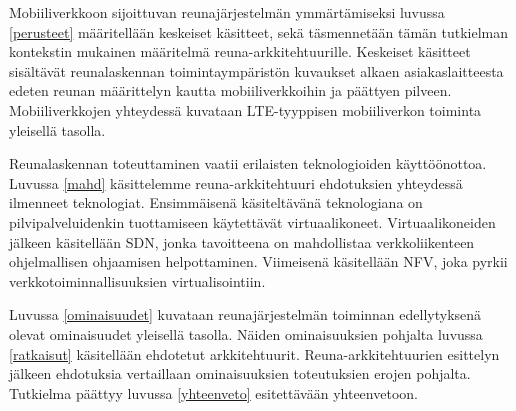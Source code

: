 Mobiiliverkkoon sijoittuvan reunajärjestelmän ymmärtämiseksi luvussa \ref{perusteet} määritellään keskeiset käsitteet, sekä täsmennetään tämän tutkielman kontekstin mukainen määritelmä reuna-arkkitehtuurille.
Keskeiset käsitteet sisältävät reunalaskennan toimintaympäristön kuvaukset alkaen asiakaslaitteesta edeten reunan määrittelyn kautta mobiiliverkkoihin ja päättyen pilveen.
Mobiiliverkkojen yhteydessä kuvataan LTE-tyyppisen mobiiliverkon toiminta yleisellä tasolla.

Reunalaskennan toteuttaminen vaatii erilaisten teknologioiden käyttöönottoa. Luvussa \ref{mahd} käsittelemme reuna-arkkitehtuuri ehdotuksien yhteydessä ilmenneet teknologiat. Ensimmäisenä käsiteltävänä teknologiana on pilvipalveluidenkin tuottamiseen käytettävät virtuaalikoneet.
Virtuaalikoneiden jälkeen käsitellään SDN, jonka tavoitteena on mahdollistaa verkkoliikenteen ohjelmallisen ohjaamisen helpottaminen. 
Viimeisenä käsitellään NFV, joka pyrkii verkkotoiminnallisuuksien virtualisointiin.

 Luvussa \ref{ominaisuudet} kuvataan reunajärjestelmän toiminnan edellytyksenä olevat ominaisuudet yleisellä tasolla. 
Näiden ominaisuuksien pohjalta luvussa \ref{ratkaisut} käsitellään ehdotetut arkkitehtuurit. 
Reuna-arkkitehtuurien esittelyn jälkeen ehdotuksia vertaillaan ominaisuuksien toteutuksien erojen pohjalta.
Tutkielma päättyy luvussa \ref{yhteenveto} esitettävään yhteenvetoon.

